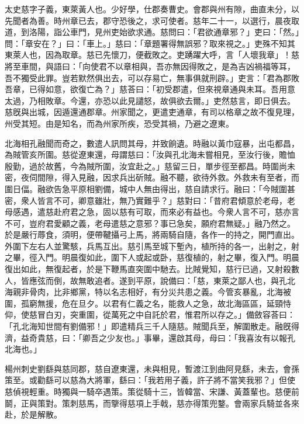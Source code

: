 \begin{pinyinscope}
 
 
 太史慈字子義，東萊黃人也。少好學，仕郡奏曹史。會郡與州有隙，曲直未分，以先聞者為善。時州章已去，郡守恐後之，求可使者。慈年二十一，以選行，晨夜取道，到洛陽，詣公車門，見州吏始欲求通。慈問曰：「君欲通章邪？」吏曰：「然。」問：「章安在？」曰：「車上。」慈曰：「章題署得無誤邪？取來視之。」吏殊不知其東萊人也，因為取章。慈已先懷刀，便截敗之。吏踴躍大呼，言「人壞我章」！慈將至車間，與語曰：「向使君不以章相與，吾亦無因得敗之，是為吉凶禍福等耳，吾不獨受此罪。豈若默然俱出去，可以存易亡，無事俱就刑辟。」吏言：「君為郡敗吾章，已得如意，欲復亡為？」慈荅曰：「初受郡遣，但來視章通與未耳。吾用意太過，乃相敗章。今還，亦恐以此見譴怒，故俱欲去爾。」吏然慈言，即日俱去。慈旣與出城，因遁還通郡章。州家聞之，更遣吏通章，有司以格章之故不復見理，州受其短。由是知名，而為州家所疾，恐受其禍，乃避之遼東。
 
 
 
 
 北海相孔融聞而奇之，數遣人訊問其母，并致餉遺。時融以黃巾寇暴，出屯都昌，為賊管亥所圍。慈從遼東還，母謂慈曰：「汝與孔北海未嘗相見，至汝行後，贍恤殷勤，過於故舊，今為賊所圍，汝宜赴之。」慈留三日，單步徑至都昌。時圍尚未密，夜伺間隙，得入見融，因求兵出斫賊。融不聽，欲待外救。外救未有至者，而圍日偪。融欲告急平原相劉備，城中人無由得出，慈自請求行。融曰：「今賊圍甚密，衆人皆言不可，卿意雖壯，無乃實難乎？」慈對曰：「昔府君傾意於老母，老母感遇，遣慈赴府君之急，固以慈有可取，而來必有益也。今衆人言不可，慈亦言不可，豈府君愛顧之義，老母遣慈之意邪？事已急矣，願府君無疑。」融乃然之。於是嚴行蓐食，須明，便帶鞬攝弓上馬，將兩騎自隨，各作一的持之，開門直出。外圍下左右人並驚駭，兵馬互出。慈引馬至城下塹內，植所持的各一，出射之，射之畢，徑入門。明晨復如此，圍下人或起或卧，慈復植的，射之畢，復入門。明晨復出如此，無復起者，於是下鞭馬直突圍中馳去。比賊覺知，慈行已過，又射殺數人，皆應弦而倒，故無敢追者。遂到平原，說備曰：「慈，東萊之鄙人也，與孔北海親非骨肉，比非鄉黨，特以名志相好，有分災共患之義。今管亥暴亂，北海被圍，孤窮無援，危在旦夕。以君有仁義之名，能救人之急，故北海區區，延頸恃仰，使慈冒白刃，突重圍，從萬死之中自託於君，惟君所以存之。」備斂容荅曰：「孔北海知世間有劉備邪！」即遣精兵三千人隨慈。賊聞兵至，解圍散走。融旣得濟，益奇貴慈，曰：「卿吾之少友也。」事畢，還啟其母，母曰：「我喜汝有以報孔北海也。」
 
 
 
 
 楊州刺史劉繇與慈同郡，慈自遼東還，未與相見，暫渡江到曲阿見繇，未去，會孫策至。或勸繇可以慈為大將軍，繇曰：「我若用子義，許子將不當笑我邪？」但使慈偵視輕重。時獨與一騎卒遇策。策從騎十三，皆韓當、宋謙、黃蓋輩也。慈便前鬬，正與策對。策刺慈馬，而擥得慈項上手戟，慈亦得策兜鍪。會兩家兵騎並各來赴，於是解散。
 

\end{pinyinscope}
